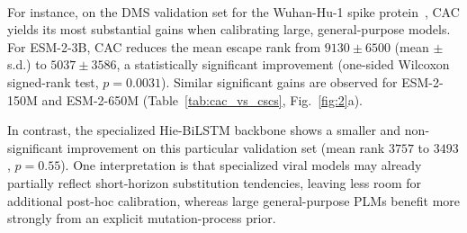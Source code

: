 \documentclass[pdflatex,sn-nature]{sn-jnl}
\renewcommand\cite[1]{\unskip\textsuperscript{\citep{#1}}}
\begin{document}
For instance, on the DMS validation set for the Wuhan-Hu-1 spike protein~\cite{baum2020antibody}, CAC yields its most substantial gains when calibrating large, general-purpose models. For ESM-2-3B, CAC reduces the mean escape rank from $9130 \pm 6500$ (mean $\pm$ s.d.) to $5037 \pm 3586$, a statistically significant improvement (one-sided Wilcoxon signed-rank test, $p = 0.0031$). Similar significant gains are observed for ESM-2-150M and ESM-2-650M (Table~\ref{tab:cac_vs_cscs}, Fig.~\ref{fig:2}a).


In contrast, the specialized Hie-BiLSTM backbone shows a smaller and non-significant improvement on this particular validation set (mean rank $3757$ to $3493$, $p=0.55$). One interpretation is that specialized viral models may already partially reflect short-horizon substitution tendencies, leaving less room for additional post-hoc calibration, whereas large general-purpose PLMs benefit more strongly from an explicit mutation-process prior.
\end{document}

